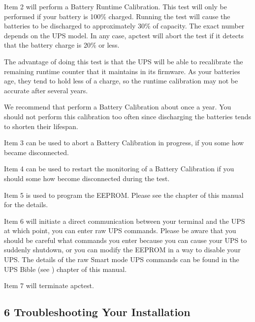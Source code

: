 Item 2 will perform a Battery Runtime Calibration. This test will only be
performed if your battery is 100\% charged. Running the test will cause the
batteries to be discharged to approximately 30\% of capacity. The exact number
depends on the UPS model. In any case, apctest will abort the test if it
detects that the battery charge is 20\% or less.  

The advantage of doing this test is that the UPS will be able to recalibrate
the remaining runtime counter that it maintains in its firmware. As your
batteries age, they tend to hold less of a charge, so the runtime calibration
may not be accurate after several years.  

We recommend that perform a Battery Calibration about once a year. You should
not perform this calibration too often since discharging the batteries tends
to shorten their lifespan.  

Item 3 can be used to abort a Battery Calibration in progress, if you some how
became disconnected.  

Item 4 can be used to restart the monitoring of a Battery Calibration if you
should some how become disconnected during the test.  

Item 5 is used to program the EEPROM. Please see the 
 chapter
of this manual for the details.  

Item 6 will initiate a direct communication between your terminal and the UPS
at which point, you can enter raw UPS commands. Please be aware that you
should be careful what commands you enter because you can cause your UPS to
suddenly shutdown, or you can modify the EEPROM in a way to disable your UPS.
The details of the raw Smart mode UPS commands can be found in the UPS Bible
(see 
) chapter of this
manual.  

Item 7 will terminate apctest. 

\label{Troubleshooting-Your-Installation}

\subsection*{6 Troubleshooting Your Installation}

\label{index-Troubleshooting-_0028see-problems_0029-101}
\label{index-Problems-102}

